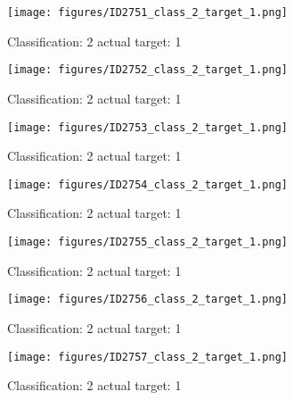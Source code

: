 \begin{figure}[h!]
\begin{center}
\texttt{[image: figures/ID2751\_class\_2\_target\_1.png]}
\end{center}
\caption{ Classification: 2 actual target: 1}
\label{fig:ID2751_class_2_target_1}
\end{figure}
\begin{figure}[h!]
\begin{center}
\texttt{[image: figures/ID2752\_class\_2\_target\_1.png]}
\end{center}
\caption{ Classification: 2 actual target: 1}
\label{fig:ID2752_class_2_target_1}
\end{figure}
\begin{figure}[h!]
\begin{center}
\texttt{[image: figures/ID2753\_class\_2\_target\_1.png]}
\end{center}
\caption{ Classification: 2 actual target: 1}
\label{fig:ID2753_class_2_target_1}
\end{figure}
\begin{figure}[h!]
\begin{center}
\texttt{[image: figures/ID2754\_class\_2\_target\_1.png]}
\end{center}
\caption{ Classification: 2 actual target: 1}
\label{fig:ID2754_class_2_target_1}
\end{figure}
\begin{figure}[h!]
\begin{center}
\texttt{[image: figures/ID2755\_class\_2\_target\_1.png]}
\end{center}
\caption{ Classification: 2 actual target: 1}
\label{fig:ID2755_class_2_target_1}
\end{figure}
\begin{figure}[h!]
\begin{center}
\texttt{[image: figures/ID2756\_class\_2\_target\_1.png]}
\end{center}
\caption{ Classification: 2 actual target: 1}
\label{fig:ID2756_class_2_target_1}
\end{figure}
\begin{figure}[h!]
\begin{center}
\texttt{[image: figures/ID2757\_class\_2\_target\_1.png]}
\end{center}
\caption{ Classification: 2 actual target: 1}
\label{fig:ID2757_class_2_target_1}
\end{figure}
